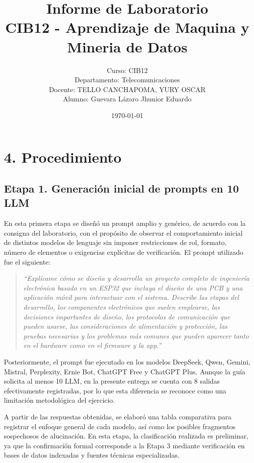 \documentclass[11pt,a4paper]{article}
\title{Informe de Laboratorio\\CIB12 - Aprendizaje de Maquina y Mineria de Datos}
\author{
Curso: CIB12\\
Departamento: Telecomunicaciones\\
Docente: TELLO CANCHAPOMA, YURY OSCAR\\
Alumno: Guevara Lázaro Jhunior Eduardo
}
\date{\today}
\begin{document}
\maketitle




\section{4. Procedimiento}

\subsection{Etapa 1. Generación inicial de prompts en 10 LLM}

En esta primera etapa se diseñó un prompt amplio y genérico, de acuerdo con la consigna del laboratorio, con el propósito de observar el comportamiento inicial de distintos modelos de lenguaje sin imponer restricciones de rol, formato, número de elementos o exigencias explícitas de verificación. El prompt utilizado fue el siguiente:

\begin{quote}
\textit{``Explícame cómo se diseña y desarrolla un proyecto completo de ingeniería electrónica basado en un ESP32 que incluya el diseño de una PCB y una aplicación móvil para interactuar con el sistema. Describe las etapas del desarrollo, los componentes electrónicos que suelen emplearse, las decisiones importantes de diseño, los protocolos de comunicación que pueden usarse, las consideraciones de alimentación y protección, las pruebas necesarias y los problemas más comunes que pueden aparecer tanto en el hardware como en el firmware y la app.''}
\end{quote}

Posteriormente, el prompt fue ejecutado en los modelos DeepSeek, Qwen, Gemini, Mistral, Perplexity, Ernie Bot, ChatGPT Free y ChatGPT Plus. Aunque la guía solicita al menos 10 LLM, en la presente entrega se cuenta con 8 salidas efectivamente registradas, por lo que esta diferencia se reconoce como una limitación metodológica del ejercicio.

A partir de las respuestas obtenidas, se elaboró una tabla comparativa para registrar el enfoque general de cada modelo, así como los posibles fragmentos sospechosos de alucinación. En esta etapa, la clasificación realizada es preliminar, ya que la confirmación formal corresponde a la Etapa 3 mediante verificación en bases de datos indexadas y fuentes técnicas especializadas.
\end{document}
